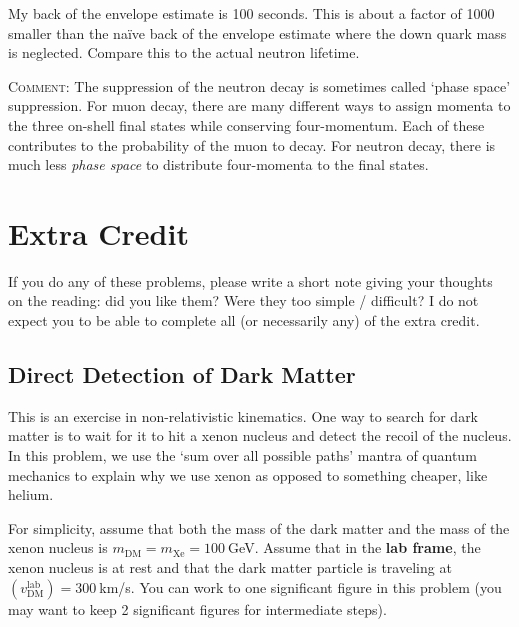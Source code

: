 \documentclass[12pt]{article}
\begin{document}
My back of the envelope estimate is 100 seconds. This is about a factor of 1000 smaller than the na\"ive back of the envelope estimate where the down quark mass is neglected. Compare this to the actual neutron lifetime.

\textsc{Comment}: The suppression of the neutron decay is sometimes called `phase space' suppression. For muon decay, there are many different ways to assign momenta to the three on-shell final states while conserving four-momentum. Each of these contributes to the probability of the muon to decay. For neutron decay, there is much less \emph{phase space} to distribute four-momenta to the final states. 








\section{Extra Credit}

If you do any of these problems, please write a short note giving your thoughts on the reading: did you like them? Were they too simple / difficult? I do not expect you to be able to complete all (or necessarily any) of the extra credit.

\subsection{Direct Detection of Dark Matter}

This is an exercise in non-relativistic kinematics. One way to search for dark matter is to wait for it to hit a xenon nucleus and detect the recoil of the nucleus. In this problem, we use the `sum over all possible paths' mantra of quantum mechanics to explain why we use xenon as opposed to something cheaper, like helium. 

For simplicity, assume that both the mass of the dark matter and the mass of the xenon nucleus is $m_{\text{DM}} = m_{\text{Xe}}=100~$GeV. Assume that in the \textbf{lab frame}, the xenon nucleus is at rest and that the dark matter particle is traveling at $(v_\text{DM}^\text{lab})=300~$km/s. You can work to one significant figure in this problem (you may want to keep 2 significant figures for intermediate steps). 
\end{document}
